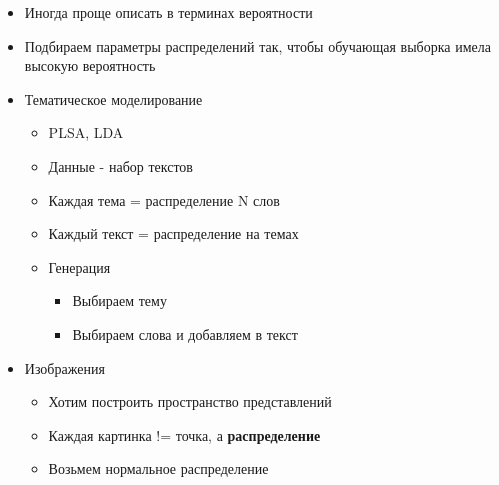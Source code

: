 \documentclass[a4paper, 12pt]{article}
\begin{document}
\begin{itemize}
\item
  
  Иногда проще описать в терминах вероятности
  
\item
  
  Подбираем параметры распределений так, чтобы обучающая выборка имела
  высокую вероятность
  
\item
  
  {Тематическое моделирование}
  

  \begin{itemize}
  \item
    
    {PLSA, LDA}
    
  \item
    
    Данные - набор текстов
    
  \item
    
    Каждая тема = распределение N слов
    
  \item
    
    Каждый текст = распределение на темах
    
  \item
    
    Генерация
    

    \begin{itemize}
    \item
      
      Выбираем тему
      
    \item
      
      Выбираем слова и добавляем в текст
      
    \end{itemize}
  \end{itemize}
\item
  
  {Изображения}
  

  \begin{itemize}
  \item
    
    Хотим построить пространство представлений
    
  \item
    
    Каждая картинка != точка, а \textbf{распределение}
    
  \item
    
    Возьмем нормальное распределение
    
  \end{itemize}
\end{itemize}
\end{document}
